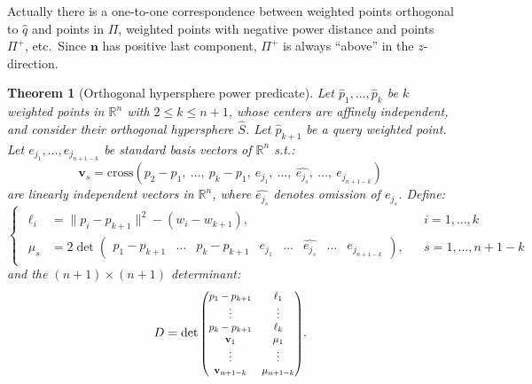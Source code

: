 \documentclass[12pt]{article}
\newtheorem{theorem}{Theorem}
\theoremstyle{definition}
\theoremstyle{remark}
\begin{document}
Actually there is a one-to-one correspondence between weighted points orthogonal to $\hat q$ and points in $\Pi$, weighted points with negative power distance and points $\Pi^+$, etc.\ Since $\mathbf{n}$ has positive last component, $\Pi^+$ is always ``above'' in the $z$-direction.



\begin{theorem}[Orthogonal hypersphere power predicate]
Let $\hat p_1, \ldots, \hat p_k$ be $k$ weighted points in $\mathbb{R}^n$ 
with $2 \leq k \leq n+1$, whose centers are affinely independent, and consider their orthogonal hypersphere $\hat S$. Let $\hat p_{k+1}$ be a query weighted point. 
Let $e_{j_1}, \ldots, e_{j_{n+1-k}}$ be standard basis vectors of $\mathbb{R}^n$ 
s.t.:
\begin{equation*}
    \mathbf{v}_s = \mathrm{cross}(p_2 - p_1,\ \ldots,\ p_k - p_1,\ 
e_{j_1},\ \ldots,\ \widehat{e_{j_s}},\ \ldots,\ e_{j_{n+1-k}})
\end{equation*}
are linearly independent vectors in $\mathbb{R}^{n}$, where $\widehat{e_{j_s}}$ denotes omission of 
$e_{j_s}$. Define:
\begin{equation*}
\begin{cases}
    \begin{aligned}
    \ell_i &= \|p_i - p_{k+1}\|^2 - (w_i - w_{k+1}), && i = 1, \ldots, k \\
    \mu_s &= 
           2 \det \left( \begin{array}{c|c|c|c|c|c|c|c}
                      p_{1} - p_{k+1}& \ldots & p_{k} - p_{k+1} & e_{j_1} & \ldots & \widehat{e_{j_s}} & \ldots 
& e_{j_{n+1-k}}
\end{array}\right), && s = 1, \ldots, n+1-k
\end{aligned}
\end{cases}
\end{equation*}
and the $(n+1) \times (n+1)$ determinant:
\begin{equation*}
    D = \det 
    \scalebox{0.82}{$\begin{pmatrix} 
p_1 - p_{k+1} & \ell_1 \\ 
\vdots & \vdots \\ 
p_k - p_{k+1} & \ell_k \\ 
\mathbf{v}_1 & \mu_1 \\ 
\vdots & \vdots \\ 
\mathbf{v}_{n+1-k} & \mu_{n+1-k}
\end{pmatrix}$}.

\end{equation*}
\end{theorem}
\end{document}
